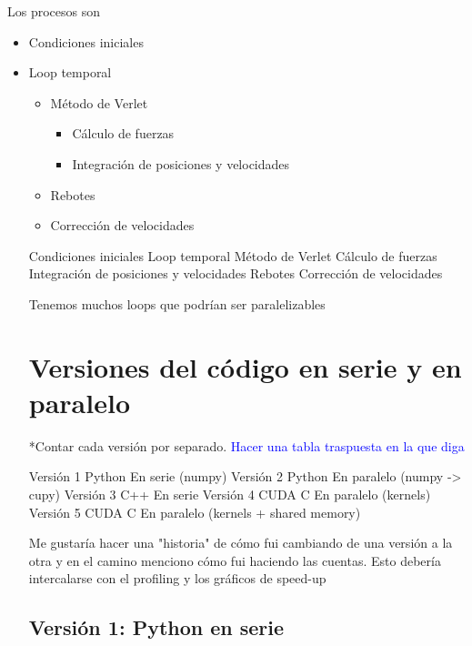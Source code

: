 \documentclass[aps,prb,twocolumn,superscriptaddress,floatfix,longbibliography]{revtex4-2}
\newcounter{para}
\begin{document}
Los procesos son
\begin{itemize}
    \item Condiciones iniciales
    \item Loop temporal
    \begin{itemize}
        \item Método de Verlet
        \begin{itemize}
            \item Cálculo de fuerzas
            \item Integración de posiciones y velocidades
        \end{itemize}
        \item Rebotes
        \item Corrección de velocidades
    \end{itemize}


Condiciones iniciales
Loop temporal
Método de Verlet
Cálculo de fuerzas
Integración de posiciones y velocidades
Rebotes
Corrección de velocidades




Tenemos muchos loops que podrían ser paralelizables

\section{Versiones del código en serie y en paralelo}
*Contar cada versión por separado.
\textcolor{blue}{Hacer una tabla traspuesta en la que diga}

Versión 1	Python	En serie (numpy)
Versión 2	Python	En paralelo (numpy -> cupy)
Versión 3	C++	En serie
Versión 4	CUDA C	En paralelo (kernels)
Versión 5	CUDA C	En paralelo (kernels + shared memory)

Me gustaría hacer una "historia" de cómo fui cambiando de una versión a la otra y en el camino menciono cómo fui haciendo las cuentas. Esto debería intercalarse con el profiling y los gráficos de speed-up

\subsection{Versión 1: Python en serie}


\end{itemize}
\end{document}
